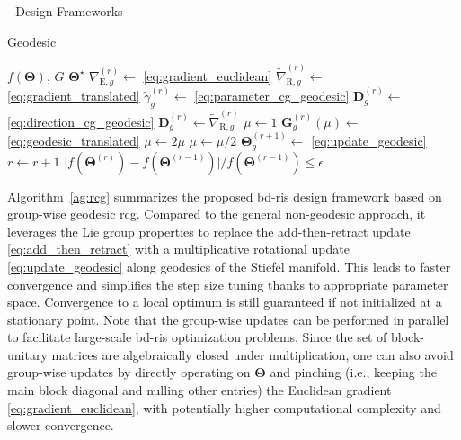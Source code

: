 \documentclass[journal]{IEEEtran}
\makeatletter
\newcommand\setalgorithmcaptionfont[1]{%
	\let\my@floatc@ruled\floatc@ruled          %
	\def\floatc@ruled{%
		\global\let\floatc@ruled\my@floatc@ruled %
		#1\floatc@ruled}}
\makeatother
\begin{document}
\begin{section}{- Design Frameworks}
\begin{subsection}{Geodesic }
		\setalgorithmcaptionfont{\small}
		\begin{algorithm}[!t]
			\small
			\caption{Group-wise geodesic \gls{rcg} for \gls{bd}-\gls{ris} design}
			\label{ag:rcg}
			\begin{algorithmic}[1]
				\Require $f(\mathbf{\Theta})$, $G$
				\Ensure $\mathbf{\Theta}^\star$
				\Repeat
						\State $\nabla_{\mathrm{E},g}^{(r)} \gets$ \eqref{eq:gradient_euclidean} \label{ln:gradient_euclidean}
						\State $\tilde{\nabla}_{\mathrm{R},g}^{(r)} \gets$ \eqref{eq:gradient_translated}
						\State $\tilde{\gamma}_g^{(r)} \gets$ \eqref{eq:parameter_cg_geodesic}
						\State $\mathbf{D}_g^{(r)} \gets$ \eqref{eq:direction_cg_geodesic}
						 
							\State $\mathbf{D}_g^{(r)} \gets \tilde{\nabla}_{\mathrm{R},g}^{(r)}$
						\EndIf
						\State $\mu \gets 1$
						\State $\mathbf{G}_g^{(r)}(\mu) \gets$ \eqref{eq:geodesic_translated}
						 \label{ln:armijo_start}
							\State $\mu \gets 2 \mu$
						\EndWhile
							\State $\mu \gets \mu / 2$
						\EndWhile \label{ln:armijo_end}
						\State $\mathbf{\Theta}_g^{(r+1)} \gets$ \eqref{eq:update_geodesic}
					\EndFor
					\State $r \gets r+1$
				\Until $\lvert f(\mathbf{\Theta}^{(r)}) - f(\mathbf{\Theta}^{(r-1)}) \rvert / f(\mathbf{\Theta}^{(r-1)}) \le \epsilon$
			\end{algorithmic}
		\end{algorithm}

		Algorithm~\ref{ag:rcg} summarizes the proposed \gls{bd}-\gls{ris} design framework based on group-wise geodesic \gls{rcg}.
		Compared to the general non-geodesic approach, it leverages the Lie group properties to replace the add-then-retract update \eqref{eq:add_then_retract} with a multiplicative rotational update \eqref{eq:update_geodesic} along geodesics of the Stiefel manifold.
		This leads to faster convergence and simplifies the step size tuning thanks to appropriate parameter space.
		Convergence to a local optimum is still guaranteed if not initialized at a stationary point.
		Note that the group-wise updates can be performed in parallel to facilitate large-scale \gls{bd}-\gls{ris} optimization problems.
		Since the set of block-unitary matrices are algebraically closed under multiplication, one can also avoid group-wise updates by directly operating on $\mathbf{\Theta}$ and pinching (i.e., keeping the main block diagonal and nulling other entries) the Euclidean gradient \eqref{eq:gradient_euclidean}, with potentially higher computational complexity and slower convergence.
	\end{subsection}
\end{section}
\end{document}

